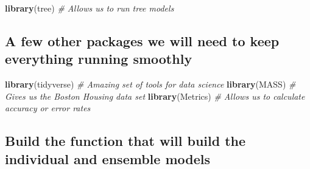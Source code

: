 \documentclass[
]{book}
\newenvironment{Shaded}{\begin{snugshade}}{\end{snugshade}}
\newcommand{\CommentTok}[1]{\textcolor[rgb]{0.56,0.35,0.01}{\textit{#1}}}
\newcommand{\FunctionTok}[1]{\textcolor[rgb]{0.13,0.29,0.53}{\textbf{#1}}}
\newcommand{\NormalTok}[1]{#1}
\begin{document}
\begin{Shaded}
\begin{Highlighting}[]
\FunctionTok{library}\NormalTok{(tree) }\CommentTok{\# Allows us to run tree models}
\end{Highlighting}
\end{Shaded}

\subsection{A few other packages we will need to keep everything running smoothly}\label{a-few-other-packages-we-will-need-to-keep-everything-running-smoothly}

\begin{Shaded}
\begin{Highlighting}[]
\FunctionTok{library}\NormalTok{(tidyverse) }\CommentTok{\# Amazing set of tools for data science}
\FunctionTok{library}\NormalTok{(MASS) }\CommentTok{\# Gives us the Boston Housing data set}
\FunctionTok{library}\NormalTok{(Metrics) }\CommentTok{\# Allows us to calculate accuracy or error rates}
\end{Highlighting}
\end{Shaded}

\subsection{Build the function that will build the individual and ensemble models}\label{build-the-function-that-will-build-the-individual-and-ensemble-models}
\end{document}
